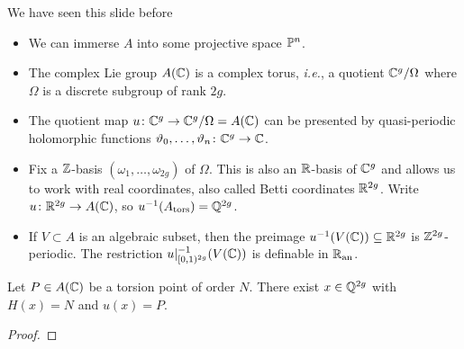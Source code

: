 \documentclass{beamer}
\begin{document}
\begin{frame}{We have seen this slide before}
  \begin{itemize}
  \item We can immerse $A$ into some projective space ${\mathbb{P}}^n$.

  \item The complex Lie group $A({\mathbb{C}})$ is a complex torus, \textit{i.e.}, a
    quotient ${\mathbb{C}}^g/\Omega$ where $\Omega$ is a discrete subgroup of
    rank $2g$.

  \item The quotient map $u\colon {\mathbb{C}}^g\rightarrow {\mathbb{C}}^g/\Omega
    =A({\mathbb{C}})$ can be presented by quasi-periodic holomorphic functions
    $\vartheta_0,\ldots,\vartheta_n \colon {\mathbb{C}}^g\rightarrow{\mathbb{C}}$.

  \item Fix a ${\mathbb{Z}}$-basis $(\omega_1,\ldots,\omega_{2g})$ of $\Omega$.
    This is also an ${\mathbb{R}}$-basis of ${\mathbb{C}}^g$ and allows us to work with
    \alert{real coordinates}, also called \alert{Betti coordinates} ${\mathbb{R}}^{2g}$.
    Write $ u\colon {\mathbb{R}}^{2g}\rightarrow A({\mathbb{C}})$, so
    $ u^{-1}(A_{\mathrm{tors}})={\mathbb{Q}}^{2g}$. 

  \item If $V\subset A$ is an algebraic subset, then the preimage
    $ u^{-1}(V({\mathbb{C}})) \subseteq{\mathbb{R}}^{2g}$ is ${\mathbb{Z}}^{2g}$-periodic.
    The restriction $u|_{[0,1)^{2g}}^{-1}(V({\mathbb{C}}))$ is definable in ${{\mathbb{R}}_{\mathrm{an}}}$.
  \end{itemize}
\end{frame}

\begin{frame}

  \begin{lemma}
    Let $P\in A({\mathbb{C}})$ be a torsion point of order $N$.
    There exist $x\in {\mathbb{Q}}^{2g}$ with $H(x)=N$ and $u(x)=P$. 
  \end{lemma}
  \begin{proof}
    \vspace{2cm}
  \end{proof}
\end{frame}
\end{document}
